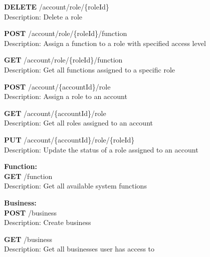 \documentclass[11pt,a4paper,pdftex]{article}
\begin{document}
\hspace*{1em}\textbf{DELETE} /account/role/\{roleId\}\\
\hspace*{2em}Description: Delete a role

\hspace*{1em}\textbf{POST} /account/role/\{roleId\}/function\\
\hspace*{2em}Description: Assign a function to a role with specified access level

\hspace*{1em}\textbf{GET} /account/role/\{roleId\}/function\\
\hspace*{2em}Description: Get all functions assigned to a specific role

\hspace*{1em}\textbf{POST} /account/\{accountId\}/role\\
\hspace*{2em}Description: Assign a role to an account

\hspace*{1em}\textbf{GET} /account/\{accountId\}/role\\
\hspace*{2em}Description: Get all roles assigned to an account

\hspace*{1em}\textbf{PUT} /account/\{accountId\}/role/\{roleId\}\\
\hspace*{2em}Description: Update the status of a role assigned to an account

\textbf{Function:}\\
\hspace*{1em}\textbf{GET} /function\\
\hspace*{2em}Description: Get all available system functions

\textbf{Business:}\\
\hspace*{1em}\textbf{POST} /business\\
\hspace*{2em}Description: Create business

\hspace*{1em}\textbf{GET} /business\\
\hspace*{2em}Description: Get all businesses user has access to
\end{document}
